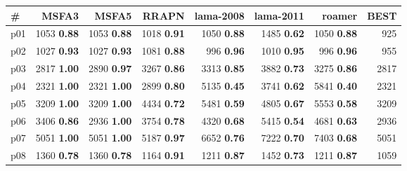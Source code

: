 \begin{tabular}{lrrrrrrr}
\toprule
\textbf{\#} & \textbf{MSFA3} & \textbf{MSFA5} & \textbf{RRAPN} & \textbf{lama-2008} & \textbf{lama-2011} & \textbf{roamer} & \textbf{BEST}\\
\midrule
\multicolumn{1}{l|}{p01} & {\footnotesize 1053} \textbf{0.88} & {\footnotesize 1053} \textbf{0.88} & {\footnotesize 1018} \textbf{0.91} & {\footnotesize 1050} \textbf{0.88} & {\footnotesize 1485} \textbf{0.62} & {\footnotesize 1050} \textbf{0.88} & \multicolumn{1}{|r}{925}\\
\multicolumn{1}{l|}{p02} & {\footnotesize 1027} \textbf{0.93} & {\footnotesize 1027} \textbf{0.93} & {\footnotesize 1081} \textbf{0.88} & {\footnotesize 996} \textbf{0.96} & {\footnotesize 1010} \textbf{0.95} & {\footnotesize 996} \textbf{0.96} & \multicolumn{1}{|r}{955}\\
\multicolumn{1}{l|}{p03} & {\footnotesize 2817} \textbf{1.00} & {\footnotesize 2890} \textbf{0.97} & {\footnotesize 3267} \textbf{0.86} & {\footnotesize 3313} \textbf{0.85} & {\footnotesize 3882} \textbf{0.73} & {\footnotesize 3275} \textbf{0.86} & \multicolumn{1}{|r}{2817}\\
\multicolumn{1}{l|}{p04} & {\footnotesize 2321} \textbf{1.00} & {\footnotesize 2321} \textbf{1.00} & {\footnotesize 2899} \textbf{0.80} & {\footnotesize 5135} \textbf{0.45} & {\footnotesize 3741} \textbf{0.62} & {\footnotesize 5841} \textbf{0.40} & \multicolumn{1}{|r}{2321}\\
\multicolumn{1}{l|}{p05} & {\footnotesize 3209} \textbf{1.00} & {\footnotesize 3209} \textbf{1.00} & {\footnotesize 4434} \textbf{0.72} & {\footnotesize 5481} \textbf{0.59} & {\footnotesize 4805} \textbf{0.67} & {\footnotesize 5553} \textbf{0.58} & \multicolumn{1}{|r}{3209}\\
\multicolumn{1}{l|}{p06} & {\footnotesize 3406} \textbf{0.86} & {\footnotesize 2936} \textbf{1.00} & {\footnotesize 3754} \textbf{0.78} & {\footnotesize 4320} \textbf{0.68} & {\footnotesize 5415} \textbf{0.54} & {\footnotesize 4681} \textbf{0.63} & \multicolumn{1}{|r}{2936}\\
\multicolumn{1}{l|}{p07} & {\footnotesize 5051} \textbf{1.00} & {\footnotesize 5051} \textbf{1.00} & {\footnotesize 5187} \textbf{0.97} & {\footnotesize 6652} \textbf{0.76} & {\footnotesize 7222} \textbf{0.70} & {\footnotesize 7403} \textbf{0.68} & \multicolumn{1}{|r}{5051}\\
\multicolumn{1}{l|}{p08} & {\footnotesize 1360} \textbf{0.78} & {\footnotesize 1360} \textbf{0.78} & {\footnotesize 1164} \textbf{0.91} & {\footnotesize 1211} \textbf{0.87} & {\footnotesize 1452} \textbf{0.73} & {\footnotesize 1211} \textbf{0.87} & \multicolumn{1}{|r}{1059}\\

\end{tabular}
